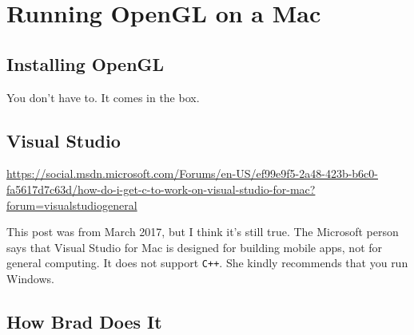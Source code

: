 \section{Running OpenGL on a Mac}

\subsection{Installing OpenGL}

You don't have to.  It comes in the box.  

\subsection{Visual Studio}

\url{https://social.msdn.microsoft.com/Forums/en-US/ef99e9f5-2a48-423b-b6c0-fa5617d7c63d/how-do-i-get-c-to-work-on-visual-studio-for-mac?forum=visualstudiogeneral}

This post was from March 2017, but I think it's still true.  The Microsoft person says that Visual Studio for Mac is designed for building mobile apps, not for general computing.  It does not support {\tt C++}.  She kindly recommends that you run Windows.  

\subsection{How Brad Does It}

